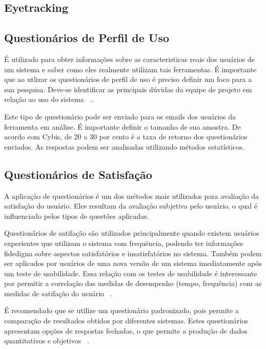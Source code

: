 \subsection{Eyetracking}


\subsection{Questionários de Perfil de Uso}
 
É utilizado para obter informações sobre as caracteristicas reais dos usuários de um sistema e saber como eles realmente utilizam tais ferramentas. É importante que ao utlizar os questionários de perfil de uso é preciso definir um foco para a sua pesquisa. Deve-se identificar as principais dúvidas da equipe de projeto em relação ao uso do sistema ~\cite{cybis2010}..

Este tipo de questionário pode ser enviado para os emails dos usuários da ferramenta em análise. É importante definir o tamanho de sua amostra. De acordo com Cybis, de 20 a 30 por cento é a taxa de retorno dos questionários enviados. As respostas podem ser analisadas utilizando métodos estatísticos.


\subsection{Questionários de Satisfação}

	A aplicação de questionários é um dos métodos mais utilizados para avaliação da satisfação do usuário. Eles resultam da avaliação subjetiva pelo usuário, o qual é influenciado pelos tipos de questões aplicadas.
	
	Questionários de satifação são utilizados principalmente quando existem usuários experientes que utilizam o sistema com frequência, podendo ter informações fidedigna sobre aspectos satisfatórios e insatisfatórios no sistema. Também podem ser aplicados por usuários de uma nova versão de um sistema imediatamente após um teste de usabilidade. Essa relação com os testes de usabilidade é interessante por permitir a correlação das medidas de desempenho (tempo, frequência) com as medidas de satifação do usuário ~\cite{cybis2010}.

	É recomendado que se utilize um questionário padronizado, pois permite a comparação de resultados obtidos por diferentes sistemas. Estes questionários apresentam opções de respostas fechadas, o que permite a produção de dados quantitativos e objetivos ~\cite{cybis2010}.

